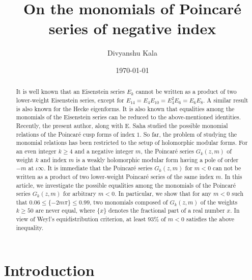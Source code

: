 \documentclass[12pt,reqno]{amsart}
\begin{document}
\title[On the monomials of Poincar\'e Series of negative index]{On the monomials of Poincar\'e series of negative index}

\author{Divyanshu Kala }


\address{Divyanshu Kala\\ \newline
Institute of Mathematical Sciences, IV Cross Street, Taramani, Chennai 600113, India.}



\date{\today}

\begin{abstract}
It is well known that an Eisenstein series $E_k$ cannot be written as a product of two lower-weight Eisenstein series, except 
for $E_{14}=E_4 E_{10}= E_4^2 E_6= E_6 E_8$. A similar result is also known for the Hecke eigenforms. It is also known that equalities among the monomials of the Eisenstein series can be reduced to the above-mentioned identities. Recently, the present author, along with E. Saha studied the possible monomial relations of the Poincar\'e cusp forms of index $1$. So far, the problem of studying the monomial relations has been restricted to the setup of holomorphic modular forms. For an even integer $k\ge 4$ and a negative integer $m$, the Poincar\'e series $G_{k}(z,m)$ of weight $k$ and index $m$ is a weakly holomorphic modular form having a pole of order $-m$ at $\iota\infty$. It is immediate that the Poincaré series $G_k(z,m)$ for $m<0$ can
not be written as a product of two lower-weight Poincar\'e series of the same index $m$. In this article, we investigate the possible equalities among the monomials of the Poincaré series 
 $G_k(z,m)$ for arbitrary $m<0$. In particular, we show that for any $m<0$ such that $0.06\le\{-2m\pi\}\le0.99$, two 
 monomials composed of $G_k(z,m)$ of the weights $k\ge 50$ are never equal, where $\{x\}$ denotes the fractional part of a real number $x$. In view of Weyl's equidistribution criterion, at least 
 $93\%$ of $m<0$ satisfies the above inequality. 
 \end{abstract}


\maketitle

\section{Introduction}
\end{document}
